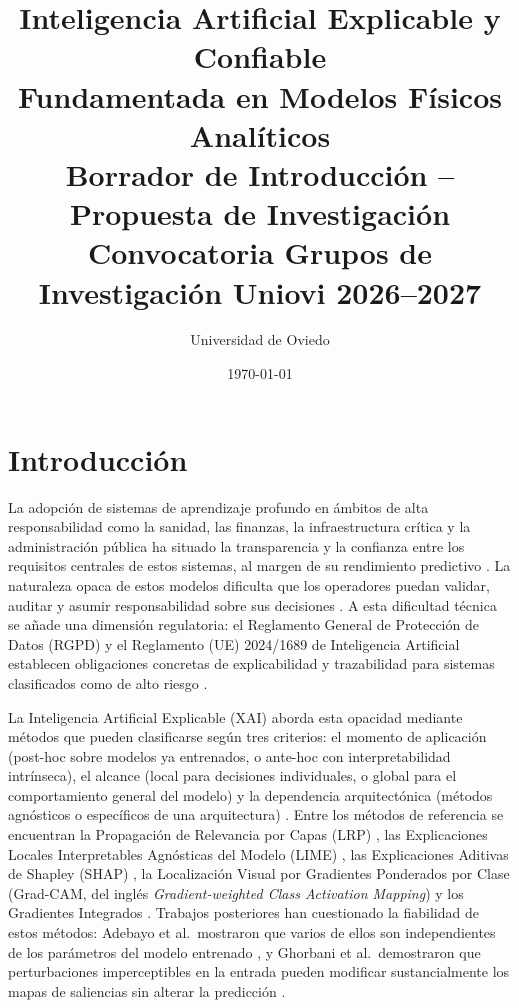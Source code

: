 \documentclass[11pt,a4paper]{article}
\title{Inteligencia Artificial Explicable y Confiable\\
Fundamentada en Modelos Físicos Analíticos\\[0.5em]
\large Borrador de Introducción -- Propuesta de Investigación\\
Convocatoria Grupos de Investigación Uniovi 2026--2027}
\author{Universidad de Oviedo}
\date{\today}
\begin{document}
\maketitle

\section{Introducción}

La adopción de sistemas de aprendizaje profundo en ámbitos de alta responsabilidad
como la sanidad, las finanzas, la infraestructura crítica y la administración pública
ha situado la transparencia y la confianza entre los requisitos centrales de estos sistemas,
al margen de su rendimiento predictivo \cite{haufe2026explainable, eu_ai_act_2024}.
La naturaleza opaca de estos modelos dificulta que los operadores puedan validar,
auditar y asumir responsabilidad sobre sus decisiones \cite{binkyte2026trustworthy, qi2026towards}.
A esta dificultad técnica se añade una dimensión regulatoria: el Reglamento General
de Protección de Datos (RGPD) y el Reglamento (UE) 2024/1689 de Inteligencia Artificial
establecen obligaciones concretas de explicabilidad y trazabilidad para sistemas
clasificados como de alto riesgo \cite{eu_ai_act_2024}.

La Inteligencia Artificial Explicable (XAI) aborda esta opacidad mediante métodos
que pueden clasificarse según tres criterios: el momento de aplicación
(post-hoc sobre modelos ya entrenados, o ante-hoc con interpretabilidad intrínseca),
el alcance (local para decisiones individuales, o global para el comportamiento general
del modelo) y la dependencia arquitectónica (métodos agnósticos o específicos
de una arquitectura) \cite{lyberatos2026xai, palikhe2025towards}.
Entre los métodos de referencia se encuentran la Propagación de Relevancia por Capas
(LRP) \cite{bach2015pixel}, las Explicaciones Locales Interpretables Agnósticas del
Modelo (LIME) \cite{ribeiro2016trust}, las Explicaciones Aditivas de Shapley
(SHAP) \cite{lundberg2017unified}, la Localización Visual por Gradientes Ponderados
por Clase (Grad-CAM, del inglés \textit{Gradient-weighted Class Activation Mapping})
\cite{selvaraju2017grad} y los Gradientes Integrados \cite{sundararajan2017axiomatic}.
Trabajos posteriores han cuestionado la fiabilidad de estos métodos:
Adebayo et al.\ mostraron que varios de ellos son independientes
de los parámetros del modelo entrenado \cite{adebayo2018sanity}, y Ghorbani et al.\
demostraron que perturbaciones imperceptibles en la entrada pueden modificar sustancialmente
los mapas de saliencias sin alterar la predicción \cite{ghorbani2019interpretation}.
\end{document}
